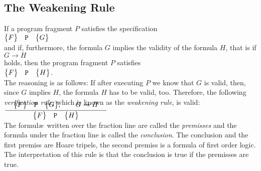 \subsection{The Weakening Rule}
If a program fragment $P$ satisfies the specification
\\[0.2cm]
\hspace*{1.3cm}
$ \bigl\{F\bigr\}\quad\texttt{P}\quad\bigl\{G\bigr\} $
\\[0.2cm]
and if, furthermore, the formula $G$ implies the validity of the formula $H$, that is if
\\[0.2cm]
\hspace*{1.3cm}
$G \rightarrow H$
\\[0.2cm]
holds, then the program fragment $P$ satisfies
\\[0.2cm]
\hspace*{1.3cm}
$\bigl\{F\bigr\}\quad\texttt{P}\quad\bigl\{H\bigr\}$.
\\[0.2cm]
The reasoning is as follows:  If after executing $P$ we know that $G$
is valid, then, since $G$ implies $H$,  the formula $H$ has to be
valid, too.
Therefore, the  following \emph{verification rule}, which is known as the \emph{weakening rule}, is valid:
\\[0.4cm]
$\bruch{\quad \hoare{F}{P}{G}, \qquad G \rightarrow H \quad}{\hoare{F}{P}{H}}$ 
\\[0.2cm]
The formul\ae\ written over the fraction line are called the \emph{premisses} and the formula under the
fraction line is called the \emph{conclusion}.   The conclusion and the first premiss  are 
Hoare tripels, the second premiss is a formula of first order logic.
The interpretation of this rule is that the conclusion is true if the premisses are true.



